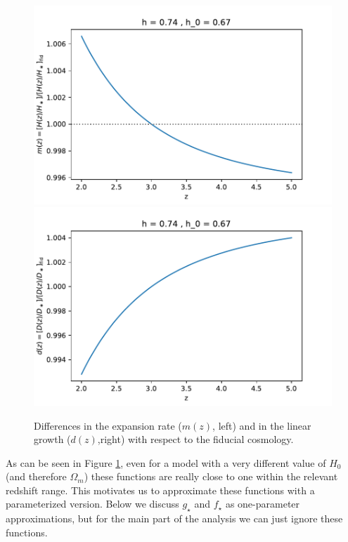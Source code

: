 \begin{figure}[ht]
 \begin{center}
  \includegraphics[scale=0.5]{Figures/mz_h074}
  \includegraphics[scale=0.5]{Figures/dz_h074}
 \end{center}
 \caption{Differences in the expansion rate ($m(z)$, left) and in the
  linear growth ($d(z)$,right) with respect to the fiducial cosmology.}
 \label{fig:mz_dz}
\end{figure}

As can be seen in Figure \ref{fig:mz_dz}, even for a model with a very
different value of $H_0$ (and therefore $\Omega_m$) these functions are 
really close to one within the relevant redshift range.
This motivates us to approximate these functions with a parameterized version.
Below we discuss $g_\star$ and $f_\star$ as one-parameter approximations,
but for the main part of the analysis we can just ignore these functions.

